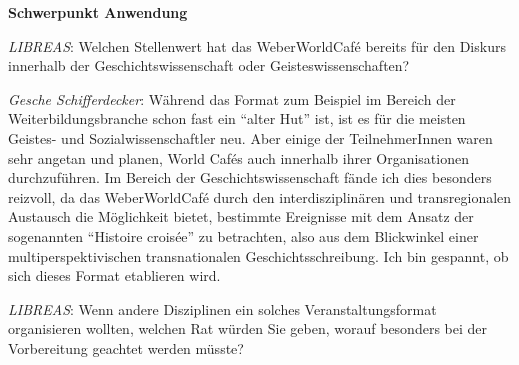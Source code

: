 \documentclass[a4paper,
fontsize=11pt,
oneside,
numbers=noperiodatend,
parskip=half-,
bibliography=totoc,
final
]{scrartcl}
\begin{document}
\textbf{Schwerpunkt Anwendung}

\emph{LIBREAS}: Welchen Stellenwert hat das WeberWorldCafé bereits für
den Diskurs innerhalb der Geschichtswissenschaft oder
Geisteswissenschaften?

\emph{Gesche Schifferdecker}: Während das Format zum Beispiel im Bereich
der Weiterbildungsbranche schon fast ein \enquote{alter Hut} ist, ist es
für die meisten Geistes- und Sozialwissenschaftler neu. Aber einige der
TeilnehmerInnen waren sehr angetan und planen, World Cafés auch
innerhalb ihrer Organisationen durchzuführen. Im Bereich der
Geschichtswissenschaft fände ich dies besonders reizvoll, da das
WeberWorldCafé durch den interdisziplinären und transregionalen
Austausch die Möglichkeit bietet, bestimmte Ereignisse mit dem Ansatz
der sogenannten \enquote{Histoire croisée} zu betrachten, also aus dem
Blickwinkel einer multiperspektivischen transnationalen
Geschichtsschreibung. Ich bin gespannt, ob sich dieses Format etablieren
wird.

\emph{LIBREAS}: Wenn andere Disziplinen ein solches Veranstaltungsformat
organisieren wollten, welchen Rat würden Sie geben, worauf besonders bei
der Vorbereitung geachtet werden müsste?
\end{document}
